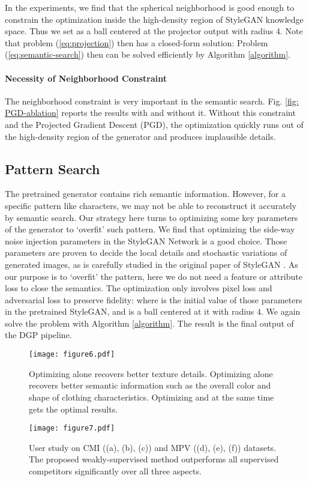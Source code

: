 \documentclass[10pt,twocolumn,letterpaper]{article}
\begin{document}
In the experiments, we find that the spherical neighborhood is good enough to constrain the optimization inside the high-density region of StyleGAN knowledge space. Thus we set  as a ball  centered at the projector output  with radius 4. Note that problem (\ref{eq:projection}) then has a closed-form solution: 
Problem (\ref{eq:semantic-search}) then can be solved efficiently by Algorithm \ref{algorithm}.


\paragraph{Necessity of Neighborhood Constraint } The neighborhood constraint  is very important in the semantic search. Fig. \ref{fig: PGD-ablation} reports the results with and without it. Without this constraint and the Projected Gradient Descent (PGD), the optimization quickly runs out of the high-density region of the generator and produces implausible details.

\subsection{Pattern Search}
The pretrained generator contains rich semantic information. However, for a specific pattern like characters, we may not be able to reconstruct it accurately by semantic search. Our strategy here turns to optimizing some key parameters  of the generator to `overfit' such pattern. We find that optimizing the side-way noise injection parameters \cite{karras2019style,abdal2019image2stylegan,abdal2020image2stylegan++} in the StyleGAN Network is a good choice. Those parameters are proven to decide the local details and stochastic variations of generated images, as is carefully studied in the original paper of StyleGAN \cite{karras2020analyzing,karras2019style}. As our purpose is to `overfit' the pattern, here we do not need a feature or attribute loss to close the semantics. The optimization only involves pixel loss and adversarial loss to preserve fidelity:
where  is the initial value of those parameters in the pretrained StyleGAN, and  is a ball centered at it with radius 4. We again solve the problem with Algorithm \ref{algorithm}. The result is the final output of the DGP pipeline. 

\begin{figure}[t]
  \centering
  \texttt{[image: figure6.pdf]}\caption{Optimizing  alone recovers better texture details.
Optimizing  alone recovers better semantic information such as the overall color and shape of clothing characteristics. Optimizing  and  at the same time gets the optimal results.}\label{fig: figure_without_w_or_n}\end{figure}
\begin{figure}[t]
  \centering
  \texttt{[image: figure7.pdf]}\caption{User study on CMI ((a), (b), (c)) and MPV ((d), (e), (f)) datasets. The proposed weakly-supervised method outperforms all supervised competitors significantly over all three aspects.}\label{fig: figure_user_study_CMI}\end{figure}
\end{document}
